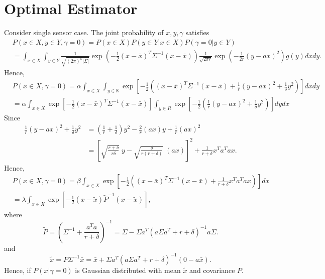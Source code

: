 \documentclass{article}
\begin{document}
\section{Optimal Estimator}
Consider single sensor case. The joint probability of $x,y,\gamma$ satisfies
\begin{align*}
  &P(x\in X,y \in Y,\gamma = 0) = P(x\in X)P(y\in Y|x\in X)P(\gamma=0|y\in Y)\\
  &= \int_{x\in X}\int_{y\in Y}  \frac{1}{\sqrt{(2\pi)^k|\Sigma|}}\exp\left( -\frac{1}{2}(x-\bar x)^T\Sigma^{-1}(x-\bar x) \right)\frac{1}{\sqrt{2\pi r}}\exp\left( -\frac{1}{2r}(y-a x)^2 \right)g(y)dxdy.
\end{align*}
Hence, 
\begin{align*}
  &P(x\in X,\gamma=0)=\alpha \int_{x\in X}\int_{y\in \mathbb R} \exp\left[-\frac{1}{2}\left( (x-\bar x)^T\Sigma^{-1}(x-\bar x)+ \frac{1}{r}(y-a x)^2 +\frac{1}{\delta} y^2\right)  \right]dxdy\\
  &=\alpha\int_{x\in X}\exp\left[- \frac{1}{2}(x-\bar x)^T\Sigma^{-1}(x-\bar x) \right]\int_{y\in R}\exp\left[- \frac{1}{2} \left(\frac{1}{r}(y-ax)^2+\frac{1}{\delta}y^2\right) \right]dy dx
\end{align*}
Since
\begin{align*}
  \frac{1}{r}(y-ax)^2+\frac{1}{\delta}y^2 &=\left(\frac{1}{r}+\frac{1}{\delta}\right) y^2 -\frac{2}{r}(ax)y+\frac{1}{r}(ax)^2 \\
  &= \left[\sqrt{\frac{r+\delta}{r\delta}}\;y - \sqrt{\frac{\delta}{r(r+\delta)}}\;(ax)\right]^2 + \frac{1}{r+\delta}x^Ta^Tax.
\end{align*}
Hence,
\begin{align*}
  &P(x\in X,\gamma=0)=\beta \int_{x\in X} \exp\left[-\frac{1}{2}\left( (x-\bar x)^T\Sigma^{-1}(x-\bar x) + \frac{1}{r+\delta}x^Ta^Tax\right)  \right]dx\\
  & = \lambda \int_{x\in X}\exp\left[ -\frac{1}{2}(x-\tilde x)\tilde P^{-1}(x-\tilde x) \right],
\end{align*}
where
\begin{displaymath}
  \tilde P = \left(\Sigma^{-1} + \frac{a^Ta}{r+\delta}\right)^{-1} = \Sigma - \Sigma a^T(a \Sigma a^T + r+\delta )^{-1} a\Sigma.
\end{displaymath}
and
\begin{displaymath}
  \tilde x = P \Sigma^{-1} \bar x = \bar x + \Sigma a^T(a\Sigma a^T + r+ \delta)^{-1}( 0 - a \bar x).
\end{displaymath}
Hence, if $P(x|\gamma = 0)$ is Gaussian distributed with mean $\tilde x$ and covariance $P$.
\end{document}

